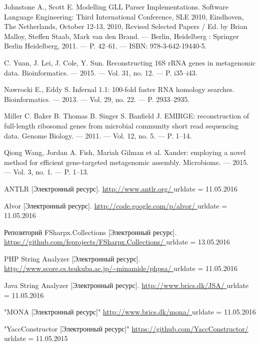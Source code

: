 \begin{thebibliography}{99}
  Johnstone A., Scott E.
  Modelling GLL Parser Implementations.
  Software Language Engineering: Third International Conference, SLE 2010, Eindhoven, The Netherlands, October 12-13, 2010, Revised Selected Papers / Ed. by Brian Malloy, Steffen Staab, Mark van den Brand. –– Berlin, Heidelberg : Springer Berlin Heidelberg, 2011. –– P. 42–61. –– ISBN: 978-3-642-19440-5.

  C. Yuan, J. Lei, J. Cole, Y. Sun.
  Reconstructing 16S rRNA genes in metagenomic data.
  Bioinformatics. –– 2015. –– Vol. 31, no. 12. –– P. i35–i43.
    
  Nawrocki E., Eddy S. 
  Infernal 1.1: 100-fold faster RNA homology searches.
  Bioinformatics. –– 2013. –– Vol. 29, no. 22. –– P. 2933–2935.

  Miller C. Baker B. Thomas B. Singer S. Banfield J.
  EMIRGE: reconstruction of full-length ribosomal genes from microbial community short read sequencing data.
  Genome Biology. –– 2011. –– Vol. 12, no. 5. –– P. 1–14.

  Qiong Wang, Jordan A. Fish, Mariah Gilman et al.
  Xander: employing a novel method for efficient gene-targeted metagenomic assembly.
  Microbiome. –– 2015. –– Vol. 3, no. 1. –– P. 1–13.
                                                     
  ANTLR [Электронный ресурс].
  \url{http://www.antlr.org/ }
  urldate = {11.05.2016}

  Alvor [Электронный ресурс].
  \url{ http://code.google.com/p/alvor/ }
  urldate = {11.05.2016}


  Репозиторий FSharpx.Collections [Электронный ресурс].
  \url{ https://github.com/fsprojects/FSharpx.Collections/ }
  urldate = {13.05.2016}

  PHP String Analyzer [Электронный ресурс].
  \url{ http://www.score.cs.tsukuba.ac.jp/~minamide/phpsa/ }
  urldate = {11.05.2016}

  Java String Analyzer [Электронный ресурс].
  \url{ http://www.brics.dk/JSA/ }
  urldate = {11.05.2016}

  "MONA [Электронный ресурс]"
  \url{ http://www.brics.dk/mona/ }
  urldate = {11.05.2016}

  "YaccConstructor [Электронный ресурс]"
  \url{https://github.com/YaccConstructor/ }
  urldate = {11.05.2015}


\end{thebibliography}
